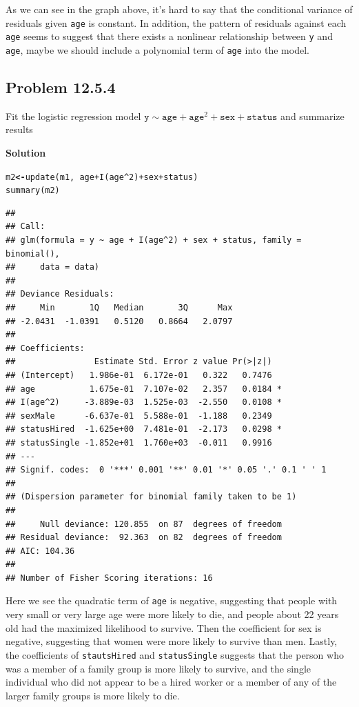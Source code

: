 \documentclass[12pt,oneside,a4paper]{article}\usepackage[]{graphicx}\usepackage[]{xcolor}
\makeatletter
\newcommand{\hlnum}[1]{\textcolor[rgb]{0,0,0}{#1}}%
\newcommand{\hlopt}[1]{\textcolor[rgb]{0,0,0}{#1}}%
\newcommand{\hlstd}[1]{\textcolor[rgb]{0,0,0}{#1}}%
\newcommand{\hlkwb}[1]{\textcolor[rgb]{0.498,0,0.333}{\textbf{#1}}}%
\newcommand{\hlkwd}[1]{\textcolor[rgb]{0,0,0}{#1}}%
\newenvironment{kframe}{%
 \def\at@end@of@kframe{}%
 \ifinner\ifhmode%
  \def\at@end@of@kframe{\end{minipage}}%
  \begin{minipage}{\columnwidth}%
 \fi\fi%
 \def\FrameCommand##1{\hskip\@totalleftmargin \hskip-\fboxsep
 \colorbox{shadecolor}{##1}\hskip-\fboxsep
     \hskip-\linewidth \hskip-\@totalleftmargin \hskip\columnwidth}%
 \MakeFramed {\advance\hsize-\width
   \@totalleftmargin\z@ \linewidth\hsize
   \@setminipage}}%
 {\par\unskip\endMakeFramed%
 \at@end@of@kframe}
\newenvironment{knitrout}{}{} %
\newcommand{\subproblem}[1]
{
    \subsection*{Problem {#1}}
}
\newcommand{\solution}
{
    \vspace{15pt}
    \noindent\ignorespaces\textbf{\large Solution}\par
}
\newcommand{\m}[1]{\texttt{{#1}}}
\makeatother
\begin{document}
As we can see in the graph above, it's hard to say that the conditional variance of residuals given \m{age} is constant. In addition, the pattern of residuals against each \m{age} seems to suggest that there exists a nonlinear relationship between \m{y} and \m{age}, maybe we should include a polynomial term of \m{age} into the model.

\subproblem{12.5.4}
Fit the logistic regression model $\m{y} \sim \m{age} + \m{age} ^ 2 + \m{sex} + \m{status}$ and summarize results
\solution
\begin{knitrout}
\color{fgcolor}\begin{kframe}
\begin{alltt}
\hlstd{m2} \hlkwb{<-} \hlkwd{update}\hlstd{(m1,} \hlopt{~} \hlstd{age} \hlopt{+} \hlkwd{I}\hlstd{(age}\hlopt{^}\hlnum{2}\hlstd{)} \hlopt{+} \hlstd{sex} \hlopt{+} \hlstd{status)}
\hlkwd{summary}\hlstd{(m2)}
\end{alltt}
\begin{verbatim}
## 
## Call:
## glm(formula = y ~ age + I(age^2) + sex + status, family = binomial(), 
##     data = data)
## 
## Deviance Residuals: 
##     Min       1Q   Median       3Q      Max  
## -2.0431  -1.0391   0.5120   0.8664   2.0797  
## 
## Coefficients:
##                Estimate Std. Error z value Pr(>|z|)  
## (Intercept)   1.986e-01  6.172e-01   0.322   0.7476  
## age           1.675e-01  7.107e-02   2.357   0.0184 *
## I(age^2)     -3.889e-03  1.525e-03  -2.550   0.0108 *
## sexMale      -6.637e-01  5.588e-01  -1.188   0.2349  
## statusHired  -1.625e+00  7.481e-01  -2.173   0.0298 *
## statusSingle -1.852e+01  1.760e+03  -0.011   0.9916  
## ---
## Signif. codes:  0 '***' 0.001 '**' 0.01 '*' 0.05 '.' 0.1 ' ' 1
## 
## (Dispersion parameter for binomial family taken to be 1)
## 
##     Null deviance: 120.855  on 87  degrees of freedom
## Residual deviance:  92.363  on 82  degrees of freedom
## AIC: 104.36
## 
## Number of Fisher Scoring iterations: 16
\end{verbatim}
\end{kframe}
\end{knitrout}

Here we see the quadratic term of \m{age} is negative, suggesting that people with very small or very large age were more likely to die, and people about 22 years old had the maximized likelihood to survive. Then the coefficient for sex is negative, suggesting that women were more likely to survive than men. Lastly, the coefficients of \m{stautsHired} and \m{statusSingle} suggests that the person who was a member of a family group is more likely to survive, and the single individual who did not appear to be a hired worker or a member of any of the larger family groups is more likely to die.
\end{document}
